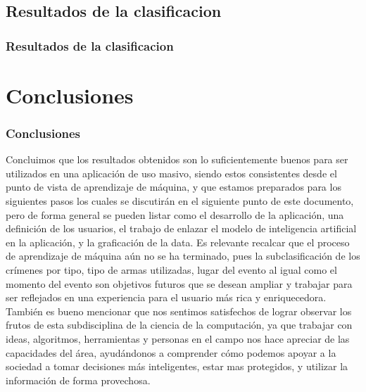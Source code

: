 \documentclass{beamer}
\begin{document}
\subsection{Resultados de la clasificacion}
\begin{frame}
\frametitle{Resultados de la clasificacion}
\end{frame}




\section{Conclusiones}

\begin{frame}
\frametitle{Conclusiones}
Concluimos que los resultados obtenidos son lo suficientemente buenos para ser utilizados en una aplicación de uso masivo, siendo estos consistentes desde el punto de vista de aprendizaje de máquina, y que estamos preparados para los siguientes pasos los cuales se discutirán en el siguiente punto de este documento, pero de forma general se pueden listar como el desarrollo de la aplicación, una definición de los usuarios, el trabajo de enlazar el modelo de inteligencia artificial en la aplicación, y la graficación de la data. 
Es relevante recalcar que el proceso de aprendizaje de máquina aún no se ha terminado, pues la subclasificación de los crímenes por tipo, tipo de armas utilizadas, lugar del evento al igual como el momento del evento son objetivos futuros que se desean ampliar y trabajar para ser reflejados en una experiencia para el usuario más rica y enriquecedora. 
También es bueno mencionar que nos sentimos satisfechos de lograr observar los frutos de esta subdisciplina de la ciencia de la computación, ya que trabajar con ideas, algoritmos, herramientas y personas en el campo nos hace apreciar de las capacidades del área, ayudándonos a comprender cómo podemos apoyar a la sociedad a tomar decisiones más inteligentes, estar mas protegidos, y utilizar la información de forma provechosa. 
\end{frame}
\end{document}
